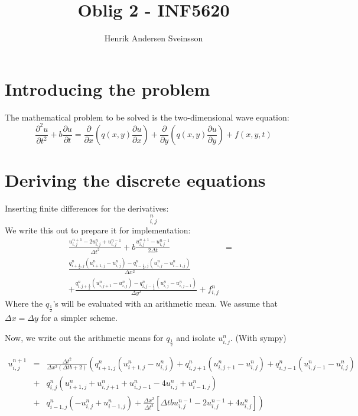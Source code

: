 \documentclass[a4paper]{article}
\title{Oblig 2 - INF5620}
\author{Henrik Andersen Sveinsson}
\begin{document}
\maketitle

\section{Introducing the problem}
The mathematical problem to be solved is the two-dimensional wave equation:
\begin{equation}
\frac{\partial^2 u}{\partial t^2} + b\frac{\partial u}{\partial t} =
\frac{\partial}{\partial x}\left( q (x,y)
\frac{\partial u}{\partial x}\right) +
\frac{\partial}{\partial y}\left( q (x,y)
\frac{\partial u}{\partial y}\right) + f(x,y,t)
\end{equation}

\section{Deriving the discrete equations}
Inserting finite differences for the derivatives:
\begin{equation}
[D_tD_t u + b D_{2t} u = D_x q D_x u + D_y q D_y u + f]_{i, j}^n
\end{equation}
We write this out to prepare it for implementation:
\begin{eqnarray}
\frac{u_{i, j}^{n+1} - 2u_{i,j}^{n} + u_{i, j}^{n-1}}{\Delta t^2} +
b\frac{u_{i, j}^{n+1}-u_{i, j}^{n-1}}{2\Delta t} &=& \\
\frac{q_{i+\frac{1}{2}, j}^n \left(u_{i+1, j}^n - u_{i, j}^n\right) -
q_{i-\frac{1}{2}, j}^n \left(u_{i, j}^n - u_{i-1, j}^n\right)}{\Delta x^2} \\
+ \frac{q_{i, j+\frac{1}{2}}^n \left(u_{i, j+1}^n - u_{i, j}^n\right) -
q_{i, j-\frac{1}{2}}^n \left(u_{i, j}^n - u_{i, j-1}^n\right)}{\Delta y^2} + f_{i, j}^n
\end{eqnarray}
Where the $q_\frac{1}{2}$'s will be evaluated with an arithmetic mean.
We assume that $\Delta x = \Delta y$ for a simpler scheme.

Now, we write out the arithmetic means for $q_{\frac{1}{2}}$ and isolate $u_{i, j}^n$. (With sympy)

\begin{eqnarray*}
u_{i, j}^{n+1} &=& \frac{\Delta t^2}{\Delta x^{2} \left(\Delta t b + 2\right)} \left( q^{n}_{{i+1, j}} (u^{n}_{{i+1, j}} - u^{{n}}_{{i, j}}) + q^{n}_{{i, j+1}} (u^{n}_{{i, j+1}} - u^{{n}}_{{i, j}}) + q^{n}_{{i, j-1}} (u^{n}_{{i, j-1}} - u^{{n}}_{{i, j}}) \right. \\ &+& \left. q^{n}_{{i, j}} (u^{n}_{{i+1, j}} + u^{n}_{{i, j+1}} + u^{n}_{{i, j-1}} - 4 u^{{n}}_{{i, j}} + u^{n}_{{i-1, j}}) \right. \\
&+& \left. q^{n}_{{i-1, j}} (-u^{{n}}_{{i, j}} +u^{n}_{{i-1, j}}) + \frac{\Delta x^{2}}{\Delta t^2}\left[ \Delta t b u^{{n-1}}_{{i, j}} - 2 u^{{n-1}}_{{i, j}} + 4 u^{{n}}_{{i, j}} \right] \right)
\end{eqnarray*}
\end{document}
